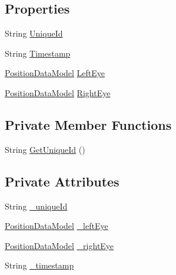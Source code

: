 \subsection*{Properties}
\begin{DoxyCompactItemize}
\item 
String \hyperlink{class_web_analyzer_1_1_models_1_1_data_model_1_1_gaze_model_a4fbd98b9986f70848075e65dec5fd8b4}{Unique\+Id}
\item 
String \hyperlink{class_web_analyzer_1_1_models_1_1_data_model_1_1_gaze_model_af6b9cc989b7eefd89d4070d1683c8539}{Timestamp}
\item 
\hyperlink{class_web_analyzer_1_1_models_1_1_data_model_1_1_position_data_model}{Position\+Data\+Model} \hyperlink{class_web_analyzer_1_1_models_1_1_data_model_1_1_gaze_model_ac6313c8c1b0c33a8d08f5f1fe99faa2a}{Left\+Eye}
\item 
\hyperlink{class_web_analyzer_1_1_models_1_1_data_model_1_1_position_data_model}{Position\+Data\+Model} \hyperlink{class_web_analyzer_1_1_models_1_1_data_model_1_1_gaze_model_a2303a593c1e6b377a480eb1903110452}{Right\+Eye}
\end{DoxyCompactItemize}
\subsection*{Private Member Functions}
\begin{DoxyCompactItemize}
\item 
String \hyperlink{class_web_analyzer_1_1_models_1_1_data_model_1_1_gaze_model_afd01f2bdad22ac2b2c667fef135b2ff9}{Get\+Unique\+Id} ()
\end{DoxyCompactItemize}
\subsection*{Private Attributes}
\begin{DoxyCompactItemize}
\item 
String \hyperlink{class_web_analyzer_1_1_models_1_1_data_model_1_1_gaze_model_a6b834df87de0ac145676b7385f2bdcb4}{\+\_\+unique\+Id}
\item 
\hyperlink{class_web_analyzer_1_1_models_1_1_data_model_1_1_position_data_model}{Position\+Data\+Model} \hyperlink{class_web_analyzer_1_1_models_1_1_data_model_1_1_gaze_model_a95213ed60e16c99277c83349acbba88d}{\+\_\+left\+Eye}
\item 
\hyperlink{class_web_analyzer_1_1_models_1_1_data_model_1_1_position_data_model}{Position\+Data\+Model} \hyperlink{class_web_analyzer_1_1_models_1_1_data_model_1_1_gaze_model_ac5b10c7779e4a0e426aba35246991cf9}{\+\_\+right\+Eye}
\item 
String \hyperlink{class_web_analyzer_1_1_models_1_1_data_model_1_1_gaze_model_a313637ceeff4c9c9bc46c03d9c2b7278}{\+\_\+timestamp}
\end{DoxyCompactItemize}
